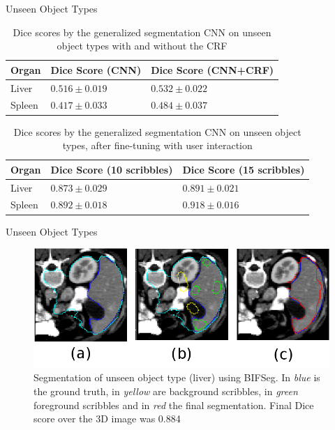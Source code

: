 \documentclass[10pt]{beamer}
\begin{document}
\begin{frame}[fragile]{Unseen Object Types}

  \begin{table}[h!]
    \centering
    \begin{tabular}{|l|l|l|}
      \hline
      Organ        & Dice Score (CNN)  & Dice Score (CNN+CRF) \\ \hline
      Liver        & $0.516 \pm 0.019$ & $0.532 \pm 0.022$\\ 
      Spleen       & $0.417 \pm 0.033$ & $0.484 \pm 0.037$ \\ \hline
    \end{tabular}
    \caption{Dice scores by the generalized segmentation CNN on unseen object types with and without the CRF}
    \label{tab:resGenUnseen}
  \end{table}


  \begin{table}[h!]
    \centering
    \begin{tabular}{|l|l|l|}
      \hline
      Organ        & Dice Score (10 scribbles) & Dice Score (15 scribbles) \\ \hline
      Liver        & $0.873 \pm 0.029$ & $0.891 \pm 0.021$\\ 
      Spleen       & $0.892 \pm 0.018$ & $0.918 \pm 0.016$ \\ \hline
    \end{tabular}
    \caption{Dice scores by the generalized segmentation CNN on unseen object types, after fine-tuning with user interaction}
    \label{tab:resGenBIFUnseen}
  \end{table}
  
\end{frame}


\begin{frame}[fragile]{Unseen Object Types} 
 \begin{figure}[h!]
    \centering
    \includegraphics[scale=0.38]{pictures/genBIFSEG2}
    \caption{Segmentation of unseen object type (liver) using BIFSeg. In \textit{blue} is the ground truth,
      in \textit{yellow} are background scribbles, in \textit{green} foreground scribbles and in \textit{red} the final segmentation.
      Final Dice score over the 3D image was 0.884
    }
    \label{fig:spleenPlot}
  \end{figure}
  
\end{frame}
\end{document}
